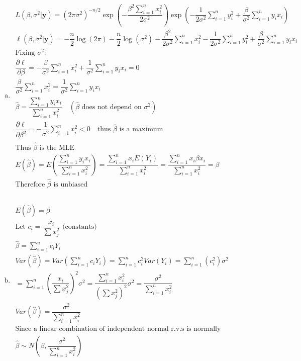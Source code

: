 \documentclass{article}
\newcommand{\B}{\beta}
\newcommand{\sg}{\sigma}
\newcommand{\hb}{\hat{\beta}}
\newcommand{\sumn}{\sum_{i=1}^{n}}
\newcommand{\dll}[1]{\dfrac{\partial\ell}{\partial{#1}}}
\newcommand{\sumx}{\sum_{i=1}^{n}x_i}
\begin{document}
\begin{flushleft}
\begin{enumerate}[(a)]
	\item 
\begin{multline*}\\
L(\B,\sigma^2|\bm{y})=(2\pi\sigma^2)^{-n/2}\exp\left(-\dfrac{\B^2\sumn x_i^2}{2\sigma^2}\right)\exp\left(-\dfrac{1}{2\sigma^2}\sumn y_i^2 +\dfrac{\B}{\sigma^2}\sumn y_ix_i\right)\\
\ell(\B,\sigma^2|\bm{y})=-\dfrac{n}{2}\log(2\pi)-\dfrac{n}{2}\log(\sigma^2)-\dfrac{\B^2}{2\sigma^2}\sumn x_i^2-\dfrac{1}{2\sigma^2}\sumn y_i^2 +\dfrac{\B}{\sigma^2}\sumn y_ix_i\\
\text{Fixing } \sigma^2:\\
\dll{\B}=-\dfrac{\B}{\sigma^2}\sumn x_i^2+\dfrac{1}{\sigma^2}\sumn y_ix_i=0\\
\dfrac{\B}{\sigma^2}\sumn x_i^2=\dfrac{1}{\sigma^2}\sumn y_ix_i\\
\hb=\dfrac{\sumn y_ix_i}{\sumn x_i^2} \quad(\hb \text{ does not depend on } \sg^2)\\
\dll{\B^2}=-\dfrac{1}{\sg^2}\sumn x_i^2<0 \quad \text{thus } \hb \text{ is a maximum}\\
\text{Thus }\hb \text{ is the MLE}\\
E(\hb)=E\left(\dfrac{\sumn y_ix_i}{\sumn x_i^2}\right)=\dfrac{\sumn x_i E(Y_i)}{\sumn x_i^2}=\dfrac{\sumx \B x_i}{\sumn x_i^2}=\B\\
\text{Therefore } \hb \text{ is unbiased}\\
\end{multline*}

	\item 
\begin{multline*}\\
E(\hb)=\B\\
\text{Let } c_i=\dfrac{x_i}{\sum x_j^2} \text{ (constants)}\\
\hb=\sumn c_i Y_i\\
Var(\hb)=Var(\sumn c_i Y_i)=\sumn c_i^2 Var(Y_i)=\sumn \left(c_i^2\right) \sigma^2\\
=\sumn\left(\dfrac{x_i}{\sum x_j^2}\right)^2 \sigma^2=\dfrac{\sumn x_i^2}{\left(\sum x_j^2\right)^2}\sg^2=\dfrac{\sg^2}{\sumn x_i^2}\\
Var(\hb)=\dfrac{\sg^2}{\sumn x_i^2}\\
\text{Since a linear combination of independent normal r.v.s is normally distributed:}\\
\hb \sim N\left(\B,\dfrac{\sg^2}{\sumn x_i^2}\right)\\
\end{multline*}
	

\end{enumerate}
\end{flushleft}
\end{document}

